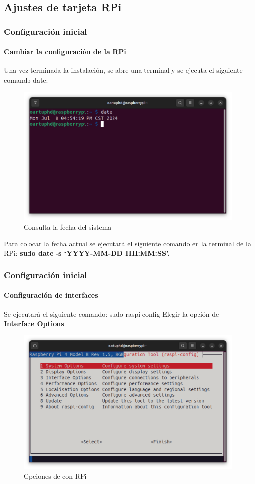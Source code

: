 \documentclass{beamer}
\begin{document}
	\subsection{Ajustes de tarjeta RPi}
	\begin{frame}
		\frametitle{Configuración inicial}
		\framesubtitle{Cambiar la configuración de la RPi}
		
		Una vez terminada la instalación, se abre una terminal y se ejecuta el siguiente comando date: 
		\begin{figure}
			\includegraphics[scale=0.25]{daterpi.png}
			\caption{Consulta la fecha del sistema}
		\end{figure}
		Para colocar la fecha actual se ejecutará el siguiente comando en la terminal de la RPi: \textbf{sudo date -s ‘YYYY-MM-DD HH:MM:SS'.}
		
	\end{frame}
	
	\begin{frame}
		\frametitle{Configuración inicial}
		\framesubtitle{Configuración de interfaces}
		Se ejecutará el siguiente comando: sudo raspi-config \newline
		Elegir la opción de \textbf{Interface Options}
		\begin{figure}
			\includegraphics[scale=0.3]{configrpi.png}
			\caption{Opciones de con RPi}
		\end{figure}
	
		
	\end{frame}
	
\end{document}
